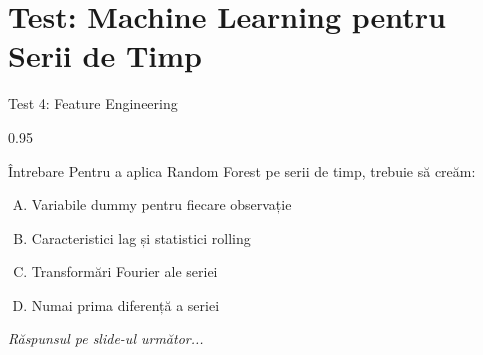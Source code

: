 \documentclass[9pt, aspectratio=169, t]{beamer}
\begin{document}
\section{Test: Machine Learning pentru Serii de Timp}

\begin{frame}{Test 4: Feature Engineering}
    \begin{cminipage}{0.95\textwidth}
    \begin{alertblock}{Întrebare}
        Pentru a aplica Random Forest pe serii de timp, trebuie să creăm:
    \end{alertblock}

    \vspace{0.3cm}

    \begin{enumerate}[A)]\setlength{\itemsep}{0pt}
        \item Variabile dummy pentru fiecare observație
        \item Caracteristici lag și statistici rolling
        \item Transformări Fourier ale seriei
        \item Numai prima diferență a seriei
    \end{enumerate}

    \vspace{0.5cm}
    \begin{flushright}\textit{Răspunsul pe slide-ul următor...}\end{flushright}
    \end{cminipage}
\end{frame}
\end{document}

